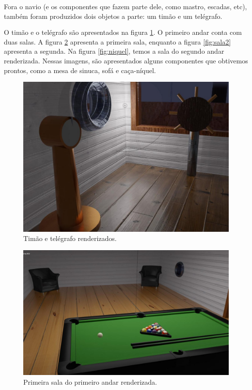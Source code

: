 Fora o navio (e os componentes que fazem parte dele, como mastro, escadas, etc), também foram produzidos dois objetos a parte: um timão e um telégrafo.

O timão e o telégrafo são apresentados na figura \ref{fig:tim_te}. O primeiro andar conta com duas salas. A figura \ref{fig:sala1} apresenta a primeira sala, enquanto a figura \ref{fig:sala2} apresenta a segunda. Na figura \ref{fig:niquel}, temos a sala do segundo andar renderizada. Nessas imagens, são apresentados alguns componentes que obtivemos prontos, como a mesa de sinuca, sofá e caça-níquel.

\begin{figure}[!h]
    \centering
    \includegraphics[scale=0.5]{imagens/timaotelegrafo.jpg}
    \caption{Timão e telégrafo renderizados.}
    \label{fig:tim_te}
\end{figure}

\begin{figure}[!h]
    \centering
    \includegraphics[scale=0.4]{imagens/sala1.jpg}
    \caption{Primeira sala do primeiro andar renderizada.}
    \label{fig:sala1}
\end{figure}


